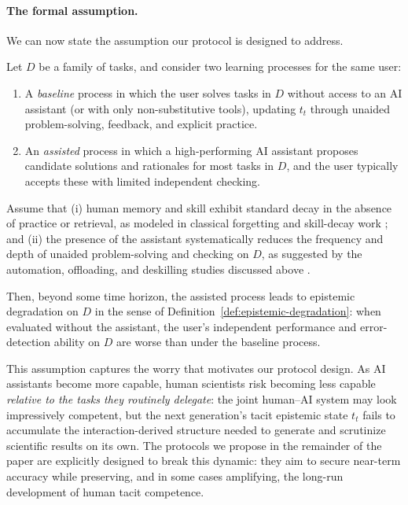 \paragraph{The formal assumption.}
We can now state the assumption our protocol is designed to address.

\begin{assumption}
\label{assumption:degradation}
Let $D$ be a family of tasks, and consider two learning processes for the same user:

\begin{enumerate}
    \item A \emph{baseline} process in which the user solves tasks in $D$ without access to
    an AI assistant (or with only non-substitutive tools), updating $t_t$ through unaided
    problem-solving, feedback, and explicit practice.

    \item An \emph{assisted} process in which a high-performing AI assistant proposes
    candidate solutions and rationales for most tasks in $D$, and the user typically
    accepts these with limited independent checking.
\end{enumerate}

Assume that (i) human memory and skill exhibit standard decay in the absence of practice
or retrieval, as modeled in classical forgetting and skill-decay work
\citep[e.g.][]{gong_yang_google_effect_2024,benge_tech_use_cognitive_aging_2025}; and
(ii) the presence of the assistant systematically reduces the frequency and depth of
unaided problem-solving and checking on $D$, as suggested by the automation,
offloading, and deskilling studies discussed above
\citep{brown_effect_automation_aviation_2017,okine_evolution_hf_aviation_2025,
natali_ai_deskilling_medicine_2025,gerlich_ai_tools_cognitive_offloading_2025,
sunday_behavioral_impacts_diagnostics_2025}.

Then, beyond some time horizon, the assisted process leads to epistemic degradation on
$D$ in the sense of Definition~\ref{def:epistemic-degradation}: when evaluated without the
assistant, the user's independent performance and error-detection ability on $D$ are worse
than under the baseline process.
\end{assumption}

This assumption captures the worry that motivates our protocol design. As AI assistants
become more capable, human scientists risk becoming less capable \emph{relative to the
tasks they routinely delegate}: the joint human--AI system may look impressively
competent, but the next generation's tacit epistemic state $t_t$ fails to accumulate the
interaction-derived structure needed to generate and scrutinize scientific results on its
own. The protocols we propose in the remainder of the paper are explicitly designed to
break this dynamic: they aim to secure near-term accuracy while preserving, and in some
cases amplifying, the long-run development of human tacit competence.


